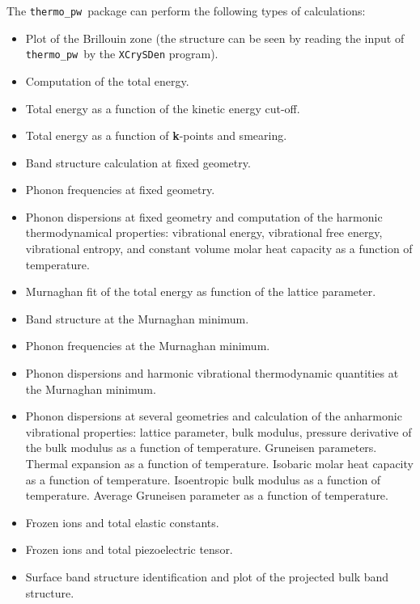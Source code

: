 \documentclass[12pt,a4paper]{article}
\def\thermo{\texttt{thermo\_pw}}
\begin{document}
The \thermo\ package can perform the following types of calculations:
\begin{itemize}
\item Plot of the Brillouin zone (the structure can be seen by reading the
input of \thermo\ by the \texttt{XCrySDen} program).

\item Computation of the total energy.

\item Total energy as a function of the kinetic energy cut-off.

\item Total energy as a function of {\bf k}-points and smearing.

\item Band structure calculation at fixed geometry.

\item Phonon frequencies at fixed geometry.

\item Phonon dispersions at fixed geometry and computation of the harmonic
thermodynamical properties: vibrational energy, vibrational free energy,
vibrational entropy, and constant volume molar heat capacity as a function
of temperature.

\item Murnaghan fit of the total energy as function of the lattice parameter.

\item Band structure at the Murnaghan minimum.

\item Phonon frequencies at the Murnaghan minimum.

\item Phonon dispersions and harmonic vibrational thermodynamic quantities
at the Murnaghan minimum.

\item Phonon dispersions at several geometries and calculation of the
anharmonic vibrational properties: lattice parameter, bulk modulus,
pressure derivative of the bulk modulus as a function of temperature.
Gruneisen parameters. Thermal expansion as a function of temperature.
Isobaric molar heat capacity as a function of temperature.
Isoentropic bulk modulus as a function of temperature.
Average Gruneisen parameter as a function of temperature.

\item Frozen ions and total elastic constants.

\item Frozen ions and total piezoelectric tensor.

\item Surface band structure identification and plot of the projected bulk
band structure.
\end{itemize}
\end{document}
